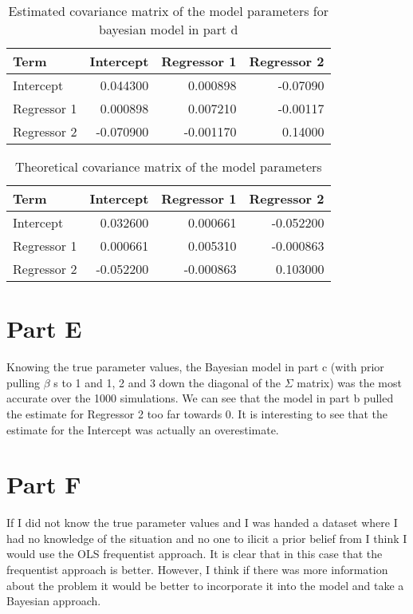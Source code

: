 \documentclass[]{book}
\begin{document}
\begin{table}

\caption{\label{tab:bayes-d-est-vcov-q3}Estimated covariance matrix of the model parameters for bayesian model in part d}
\centering
\begin{tabular}[t]{lrrr}
\toprule
Term & Intercept & Regressor 1 & Regressor 2\\
\midrule
Intercept & 0.044300 & 0.000898 & -0.07090\\
Regressor 1 & 0.000898 & 0.007210 & -0.00117\\
Regressor 2 & -0.070900 & -0.001170 & 0.14000\\
\bottomrule
\end{tabular}
\end{table}

\begin{table}

\caption{\label{tab:theory-vcov-d-q3}Theoretical covariance matrix of the model parameters}
\centering
\begin{tabular}[t]{lrrr}
\toprule
Term & Intercept & Regressor 1 & Regressor 2\\
\midrule
Intercept & 0.032600 & 0.000661 & -0.052200\\
Regressor 1 & 0.000661 & 0.005310 & -0.000863\\
Regressor 2 & -0.052200 & -0.000863 & 0.103000\\
\bottomrule
\end{tabular}
\end{table}

\hypertarget{part-e-1}{%
\section{Part E}\label{part-e-1}}

Knowing the true parameter values, the Bayesian model in part c (with prior pulling \(\beta\) s to 1 and 1, 2 and 3 down the diagonal of the \(\Sigma\) matrix) was the most accurate over the 1000 simulations. We can see that the model in part b pulled the estimate for Regressor 2 too far towards 0. It is interesting to see that the estimate for the Intercept was actually an overestimate.

\hypertarget{part-f-1}{%
\section{Part F}\label{part-f-1}}

If I did not know the true parameter values and I was handed a dataset where I had no knowledge of the situation and no one to ilicit a prior belief from I think I would use the OLS frequentist approach. It is clear that in this case that the frequentist approach is better. However, I think if there was more information about the problem it would be better to incorporate it into the model and take a Bayesian approach.
\end{document}
